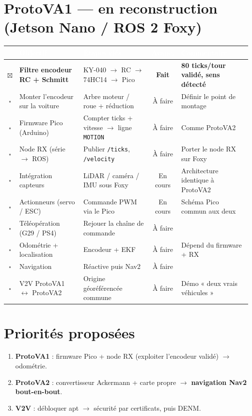 \documentclass[a4paper,10pt]{article}
\newcommand{\ok}{\textcolor{done}{$\boxtimes$}}
\newcommand{\tdo}{$\square$}
\newcommand{\Fait}{\textcolor{done}{\textbf{Fait}}}
\newcommand{\Enc}{\textcolor{prog}{En cours}}
\newcommand{\Af}{\textcolor{todo}{À faire}}
\newcommand{\hdr}{\rowcolor{headbg}
 \textcolor{white}{\textbf{\checkmark}} & \textcolor{white}{\textbf{Objectif}} &
 \textcolor{white}{\textbf{Étapes clés}} & \textcolor{white}{\textbf{Avanc.}} &
 \textcolor{white}{\textbf{Commentaire}}\\}
\begin{document}
\section{ProtoVA1 --- en reconstruction (Jetson Nano / ROS 2 Foxy)}
\vspace{2pt}
{\small
\begin{tabularx}{\textwidth}{|c|>{\raggedright\arraybackslash}m{2.9cm}|X|c|X|}
\hline
\hdr
\hline
\ok & \textbf{Filtre encodeur RC + Schmitt} & KY-040 $\rightarrow$ RC $\rightarrow$ 74HC14 $\rightarrow$ Pico & \Fait & \textbf{80 ticks/tour validé, sens détecté} \\
\hline
\rowcolor{rowalt}
\tdo & Monter l'encodeur sur la voiture & Arbre moteur / roue + réduction & \Af & Définir le point de montage \\
\tdo & Firmware Pico (Arduino) & Compter ticks + vitesse $\rightarrow$ ligne \texttt{MOTION} & \Af & Comme ProtoVA2 \\
\rowcolor{rowalt}
\tdo & Node RX (série $\rightarrow$ ROS) & Publier \texttt{/ticks}, \texttt{/velocity} & \Af & Porter le node RX sur Foxy \\
\tdo & Intégration capteurs & LiDAR / caméra / IMU sous Foxy & \Enc & Architecture identique à ProtoVA2 \\
\rowcolor{rowalt}
\tdo & Actionneurs (servo / ESC) & Commande PWM via le Pico & \Enc & Schéma Pico commun aux deux \\
\tdo & Téléopération (G29 / PS4) & Rejouer la chaîne de commande & \Af & \\
\rowcolor{rowalt}
\tdo & Odométrie + localisation & Encodeur + EKF & \Af & Dépend du firmware + RX \\
\tdo & Navigation & Réactive puis Nav2 & \Af & \\
\rowcolor{rowalt}
\tdo & V2V ProtoVA1 $\leftrightarrow$ ProtoVA2 & Origine géoréférencée commune & \Af & Démo « deux vrais véhicules » \\
\hline
\end{tabularx}}

\section*{\textcolor{primary}{Priorités proposées}}
\begin{enumerate}[leftmargin=1.4em]
\setlength{\itemsep}{1pt}
\item \textbf{ProtoVA1} : firmware Pico + node RX (exploiter l'encodeur validé) $\rightarrow$ odométrie.
\item \textbf{ProtoVA2} : convertisseur Ackermann + carte propre $\rightarrow$ \textbf{navigation Nav2 bout-en-bout}.
\item \textbf{V2V} : débloquer apt $\rightarrow$ sécurité par certificats, puis DENM.
\end{enumerate}
\end{document}
